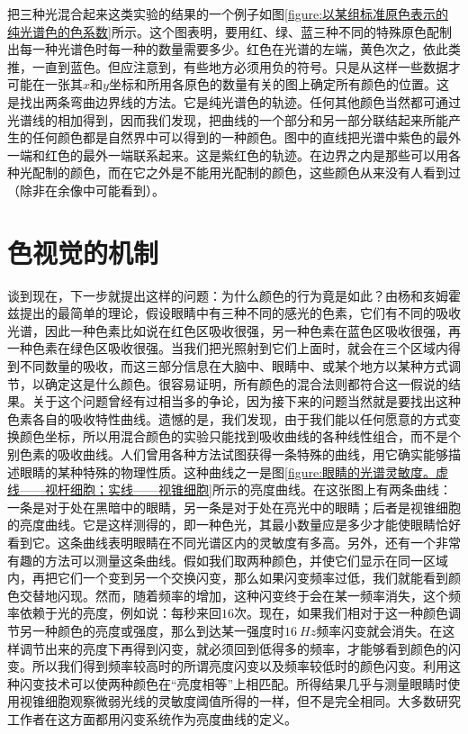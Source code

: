 把三种光混合起来这类实验的结果的一个例子如图\ref{figure:以某组标准原色表示的纯光谱色的色系数}所示。这个图表明，要用红、绿、蓝三种不同的特殊原色配制出每一种光谱色时每一种的数量需要多少。红色在光谱的左端，黄色次之，依此类推，一直到蓝色。但应注意到，有些地方必须用负的符号。只是从这样一些数据才可能在一张其$x$和$y$坐标和所用各原色的数量有关的图上确定所有颜色的位置。这是找出两条弯曲边界线的方法。它是纯光谱色的轨迹。任何其他颜色当然都可通过光谱线的相加得到，因而我们发现，把曲线的一个部分和另一部分联结起来所能产生的任何颜色都是自然界中可以得到的一种颜色。图中的直线把光谱中紫色的最外一端和红色的最外一端联系起来。这是紫红色的轨迹。在边界之内是那些可以用各种光配制的颜色，而在它之外是不能用光配制的颜色，这些颜色从来没有人看到过（除非在余像中可能看到）。

\section{色视觉的机制}

谈到现在，下一步就提出这样的问题：为什么颜色的行为竟是如此？由杨和亥姆霍兹提出的最简单的理论，假设眼睛中有三种不同的感光的色素，它们有不同的吸收光谱，因此一种色素比如说在红色区吸收很强，另一种色素在蓝色区吸收很强，再一种色素在绿色区吸收很强。当我们把光照射到它们上面时，就会在三个区域内得到不同数量的吸收，而这三部分信息在大脑中、眼睛中、或某个地方以某种方式调节，以确定这是什么颜色。很容易证明，所有颜色的混合法则都符合这一假说的结果。关于这个问题曾经有过相当多的争论，因为接下来的问题当然就是要找出这种色素各自的吸收特性曲线。遗憾的是，我们发现，由于我们能以任何愿意的方式变换颜色坐标，所以用混合颜色的实验只能找到吸收曲线的各种线性组合，而不是个别色素的吸收曲线。人们曾用各种方法试图获得一条特殊的曲线，用它确实能够描述眼睛的某种特殊的物理性质。这种曲线之一是图\ref{figure:眼睛的光谱灵敏度。虚线——视杆细胞；实线——视锥细胞}所示的亮度曲线。在这张图上有两条曲线：一条是对于处在黑暗中的眼睛，另一条是对于处在亮光中的眼睛；后者是视锥细胞的亮度曲线。它是这样测得的，即一种色光，其最小数量应是多少才能使眼睛恰好看到它。这条曲线表明眼睛在不同光谱区内的灵敏度有多高。另外，还有一个非常有趣的方法可以测量这条曲线。假如我们取两种颜色，并使它们显示在同一区域内，再把它们一个变到另一个交换闪变，那么如果闪变频率过低，我们就能看到颜色交替地闪现。然而，随着频率的增加，这种闪变终于会在某一频率消失，这个频率依赖于光的亮度，例如说：每秒来回$16$次。现在，如果我们相对于这一种颜色调节另一种颜色的亮度或强度，那么到达某一强度时$16~Hz$频率闪变就会消失。在这样调节出来的亮度下再得到闪变，就必须回到低得多的频率，才能够看到颜色的闪变。所以我们得到频率较高时的所谓亮度闪变以及频率较低时的颜色闪变。利用这种闪变技术可以使两种颜色在“亮度相等”上相匹配。所得结果几乎与测量眼睛时使用视锥细胞观察微弱光线的灵敏度阈值所得的一样，但不是完全相同。大多数研究工作者在这方面都用闪变系统作为亮度曲线的定义。


